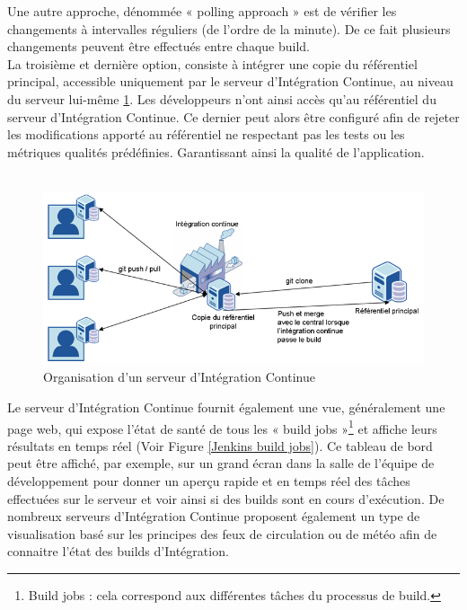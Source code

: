     Une autre approche, dénommée « polling approach » \cite{Duv07} est de vérifier les changements à intervalles réguliers (de l’ordre de la minute). De ce fait plusieurs changements peuvent être effectués entre chaque build.\\

    La troisième et dernière option, consiste à intégrer une copie du référentiel principal, accessible uniquement par le serveur d’Intégration Continue, au niveau du serveur lui-même \ref{IC server}. Les développeurs n’ont ainsi accès qu’au référentiel du serveur d’Intégration Continue. Ce dernier peut alors être configuré afin de rejeter les modifications apporté au référentiel ne respectant pas les tests ou les métriques qualités prédéfinies. Garantissant ainsi la qualité de l’application.\\\\

    \begin{figure}
      \begin{center}
        \includegraphics[scale=0.5]{images/ICServer.png}
      \end{center}
      \caption{Organisation d'un serveur d'Intégration Continue}
      \label{IC server}
    \end{figure}

    Le serveur d’Intégration Continue fournit également une vue, généralement une page web, qui expose l'état de santé de tous les « build jobs »\footnote{Build jobs : cela correspond aux différentes tâches du processus de build.} et affiche leurs résultats en temps réel (Voir Figure \ref{Jenkins build jobs}). Ce tableau de bord peut être affiché, par exemple, sur un grand écran dans la salle de l'équipe de développement pour donner un aperçu rapide et en temps réel des tâches effectuées sur le serveur et voir ainsi si des builds sont en cours d'exécution. De nombreux serveurs d’Intégration Continue proposent également un type de visualisation basé sur les principes des feux de circulation ou de météo afin de connaitre l’état des builds d’Intégration.\\

